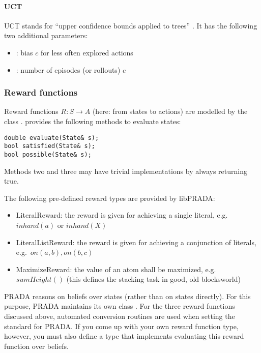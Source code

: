 \documentclass[10pt,twoside,twocolumn,fleqn]{article}
\begin{document}
\paragraph{UCT}

UCT stands for ``upper confidence bounds applied to trees''
\citep{kocsis06uct}.
It has the following two additional parameters:
\begin{itemize}
\item {}: bias $c$ for less often explored actions
\item {}: number of episodes (or rollouts) $e$
\end{itemize}



\subsubsection{Reward functions}

Reward functions $R: S \to A$ (here: from states to actions) are modelled
by the class .  provides the following methods to
evaluate states:
\begin{lstlisting}
double evaluate(State& s);
bool satisfied(State& s);
bool possible(State& s);
\end{lstlisting}
Methods two and three may have trivial implementations by always returning
true.

The following pre-defined reward types are provided by libPRADA:
\begin{itemize}
\item LiteralReward: the reward is given for achieving a single literal,
e.g.~$inhand(a)$ or $inhand(X)$
\item LiteralListReward: the reward is given for achieving a conjunction
of literals, e.g.~$on(a,b), on(b,c)$
\item MaximizeReward: the value of an atom shall be maximized,
e.g.~$sumHeight()$ (this defines the stacking task in good, old
blocksworld)
\end{itemize}

PRADA reasons on beliefs over states (rather than on states directly). For
this purpose, PRADA maintains its own class . For the
three reward functions discussed above, automated conversion routines are
used when setting the standard  for PRADA. If you come up with
your own reward function type, however, you must also define a
 type that implements evaluating this reward function
over beliefs.
\end{document}
